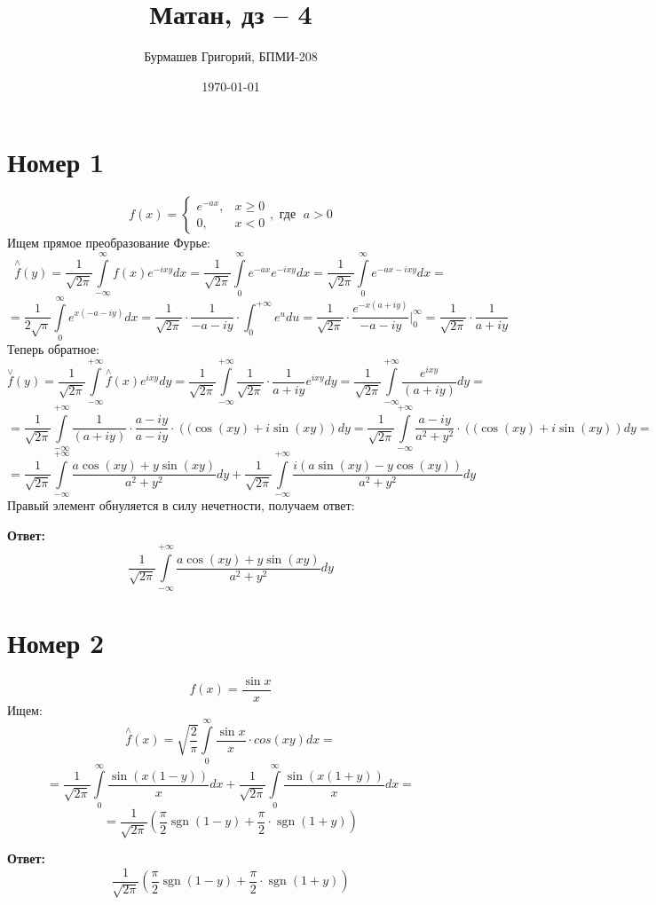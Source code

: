 \documentclass[a4paper,12pt]{article}
\author{Бурмашев Григорий, БПМИ-208}
\title{Матан, дз -- 4}
\date{\today}
\DeclareMathOperator{\sgn}{\mathop{sgn}}
\begin{document}
\maketitle
\section*{Номер 1}
\[
f(x) = 
\begin{cases}
e^{-ax},& x \geq 0 \\
0, &x < 0
\end{cases}, \text{ где } \; a > 0 
\]
Ищем прямое преобразование Фурье:
\[
\stackrel{\wedge}{f}(y) = \frac{1}{\sqrt{2\pi}} \int\limits_{-\infty}^{\infty} f(x) e^{-ixy} dx = \frac{1}{\sqrt{2\pi}} \int\limits_{0}^{\infty} e^{-ax} e^{-ixy} dx = \frac{1}{\sqrt{2\pi}} \int\limits_{0}^{\infty} e^{-ax - ixy} dx =
\]  
\[
=
\frac{1}{2\sqrt{\pi}} \int\limits_{0}^{\infty} e^{x(-a- iy)} dx  = \frac{1}{\sqrt{2\pi}} \cdot \frac{1}{-a-iy} \cdot \int_{0}^{+\infty} e^u du = \frac{1}{\sqrt{2\pi}} \cdot \frac{e^{-x(a + iy)}}{-a-iy}  \Bigg|_0^{\infty} = \frac{1}{\sqrt{2\pi}} \cdot \frac{1}{a + iy }
\] 
Теперь обратное:
\[
\stackrel{\vee}{f} (y)= \frac{1}{\sqrt{2\pi}}  \int\limits_{-\infty}^{+\infty} \stackrel{\wedge}{f}(x) e^{ixy} dy = \frac{1}{\sqrt{2\pi}}  \int\limits_{-\infty}^{+\infty}  \frac{1}{\sqrt{2\pi}} \cdot \frac{1}{a + iy } e^{ixy} dy = \frac{1}{\sqrt{2\pi}}  \int\limits_{-\infty}^{+\infty}  \frac{e^{ixy} }{(a + iy)} dy = 
\]
\[
 = \frac{1}{\sqrt{2\pi}}  \int\limits_{-\infty}^{+\infty}  \frac{1 }{(a + iy)}  \cdot \frac{a - iy}{a - iy}\cdot \left((\cos (xy) + i \sin (xy)\right)dy = \frac{1}{\sqrt{2\pi}}  \int\limits_{-\infty}^{+\infty}  \frac{a - iy}{a^2 + y^2}\cdot \left((\cos (xy) + i \sin (xy)\right)dy  = 
\]
\[
 = 
\frac{1}{\sqrt{2\pi}}  \int\limits_{-\infty}^{+\infty}  \frac{a \cos (xy) +  y \sin (xy) }{a^2 + y^2} dy + \frac{1}{\sqrt{2\pi}} \int\limits_{-\infty}^{+\infty}  \frac{i(a \sin (xy) -y \cos (xy) )}{a^2 + y^2} dy
\]
Правый элемент обнуляется в силу нечетности, получаем ответ:
\begin{center}
\textbf{Ответ: } 
\[
\frac{1}{\sqrt{2\pi}}  \int\limits_{-\infty}^{+\infty}  \frac{a \cos (xy) +  y \sin (xy) }{a^2 + y^2} dy 
\]
\end{center}
\clearpage
\section*{Номер 2}
\[
f(x) = \frac{\sin x}{x}
\]
Ищем:
\[
\stackrel{\wedge}{f}(x)  =\sqrt{ \frac{2}{\pi}} \int\limits_0^{\infty} \frac{\sin x}{x}  \cdot cos (xy) dx =
\]
\[
=
 \frac{1}{\sqrt{2\pi}} \int\limits_0^{\infty}  \frac{\sin (x ( 1- y))}{x} dx + \frac{1}{\sqrt{2\pi}} \int\limits_0^{\infty} \frac{\sin(x(1 + y))}{x} dx =
\]
\[
=
 \frac{1}{\sqrt{2\pi}}  \left(
\frac{\pi}{2} \sgn(1 -y) + \frac{\pi}{2} \cdot \sgn( 1 +y )
\right)
\] 
\begin{center}
\textbf{Ответ: } 
\[
 \frac{1}{\sqrt{2\pi}}  \left(
\frac{\pi}{2} \sgn(1 -y) + \frac{\pi}{2} \cdot \sgn( 1 +y )
\right)
\]
\end{center}
\end{document}
